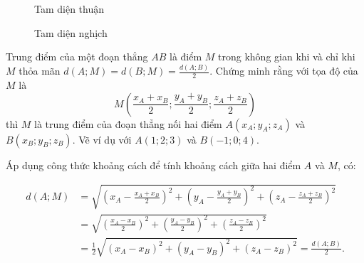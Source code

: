 \begin{figure}[H]
   \centering
   \begin{minipage}[b]{0.48\textwidth}
      \centering
      \caption{Tam diện thuận}
      \label{fig:tam dien thuan}
   \end{minipage}
   \hfill
   \begin{minipage}[b]{0.48\textwidth}
      \centering
      \caption{Tam diện nghịch}
      \label{fig:tam dien nghich}
   \end{minipage}
\end{figure}

\exercise Trung điểm của một đoạn thẳng $AB$ là điểm $M$ trong không gian khi và chỉ khi $M$ thỏa mãn $d(A;M) = d(B;M) = \frac{d(A;B)}{2}$. Chứng minh rằng với tọa độ của $M$ là $$M\left(\frac{x_A+x_B}{2}; \frac{y_A+y_B}{2}; \frac{z_A+z_B}{2}\right)$$ thì $M$ là trung điểm của đoạn thẳng nối hai điểm $A(x_A; y_A; z_A)$ và $B(x_B; y_B; z_B)$. Vẽ ví dụ với $A(1;2;3)$ và $B(-1;0;4)$.

\solution

Áp dụng công thức khoảng cách để tính khoảng cách giữa hai điểm $A$ và $M$, có:

\begin{align*}
   d(A;M) &= \sqrt{\left(x_A - \frac{x_A+x_B}{2}\right)^2 + \left(y_A - \frac{y_A+y_B}{2}\right)^2 + \left(z_A - \frac{z_A+z_B}{2}\right)^2} \\
   &= \sqrt{\left(\frac{x_A-x_B}{2}\right)^2 + \left(\frac{y_A-y_B}{2}\right)^2 + \left(\frac{z_A-z_B}{2}\right)^2} \\
   &= \frac{1}{2} \sqrt{(x_A-x_B)^2 + (y_A-y_B)^2 + (z_A-z_B)^2} = \frac{d(A;B)}{2}.
\end{align*}

